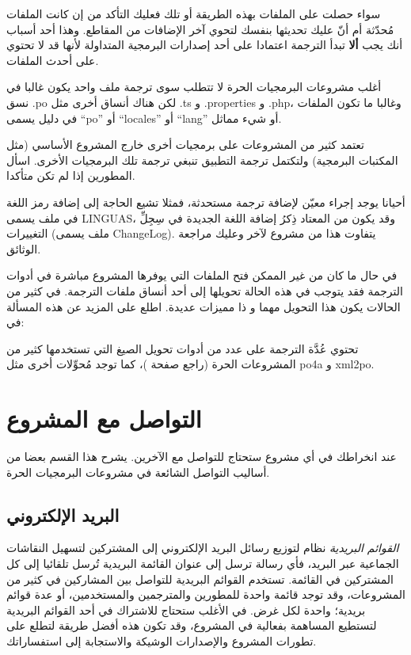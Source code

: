 سواء حصلت على الملفات بهذه الطريقة أو تلك فعليك التأكد من إن كانت
الملفات مُحدّثة أم أنّ عليك تحديثها بنفسك لتحوي آخر الإضافات من
المقاطع. وهذا أحد أسباب أنك يجب {\bf ألا} تبدأ الترجمة اعتمادا على أحد
إصدارات البرمجية المتداولة لأنها قد لا تحتوي على أحدث الملفات.

أغلب مشروعات البرمجيات الحرة لا تتطلب سوى ترجمة ملف واحد يكون غالبا في
نسق ‪.po‬ لكن هناك أنساق أخرى مثل ‪.ts‬ و ‪.properties‬ و ‪.php‬،
وغالبا ما تكون الملفات في دليل يسمى “po” أو “locales” أو “lang” أو شيء
مماثل.

تعتمد كثير من المشروعات على برمجيات أخرى خارج المشروع الأساسي (مثل
المكتبات البرمجية) ولتكتمل ترجمة التطبيق تنبغي ترجمة تلك البرمجيات
الأخرى. اسأل المطورين إذا لم تكن متأكدا.

أحيانا يوجد إجراء معيّن لإضافة ترجمة مستحدثة، فمثلا تشيع الحاجة إلى
إضافة رمز اللغة في ملف يسمى LINGUAS، وقد يكون من المعتاد ذِكرُ إضافة
اللغة الجديدة في سِجِلِّ التغييرات (ملف يسمى ChangeLog). يتفاوت هذا من
مشروع لآخر وعليك مراجعة الوثائق.

في حال ما كان من غير الممكن فتح الملفات التي يوفرها المشروع مباشرة في
أدوات الترجمة فقد يتوجب في هذه الحالة تحويلها إلى أحد أنساق ملفات
الترجمة. في كثير من الحالات يكون هذا التحويل مهما و ذا مميزات عديدة.
اطلع على المزيد عن هذه المسألة في:


تحتوي عُدَّة الترجمة على عدد من أدوات تحويل الصيغ التي تستخدمها كثير من
المشروعات الحرة (راجع صفحة \at[ref:20165030])، كما توجد
مُحوِّلات أخرى مثل po4a و xml2po.



\section{التواصل مع المشروع}
عند انخراطك في أي مشروع ستحتاج للتواصل مع الآخرين. يشرح هذا القسم بعضا
من أساليب التواصل الشائعة في مشروعات البرمجيات الحرة.

\subsection{البريد الإلكتروني}
{\it القوائم البريدية} نظام لتوزيع رسائل البريد الإلكتروني إلى المشتركين
لتسهيل النقاشات الجماعية عبر البريد، فأي رسالة ترسل إلى عنوان القائمة
البريدية تُرسل تلقائيا إلى كل المشتركين في القائمة. تستخدم القوائم
البريدية للتواصل بين المشاركين في كثير من المشروعات، وقد توجد قائمة
واحدة للمطورين والمترجمين والمستخدمين، أو عدة قوائم بريدية؛ واحدة لكل
غرض. في الأغلب ستحتاج للاشتراك في أحد القوائم البريدية لتستطيع المساهمة
بفعالية في المشروع، وقد تكون هذه أفضل طريقة لتطلع على تطورات المشروع
والإصدارات الوشيكة والاستجابة إلى استفساراتك.

